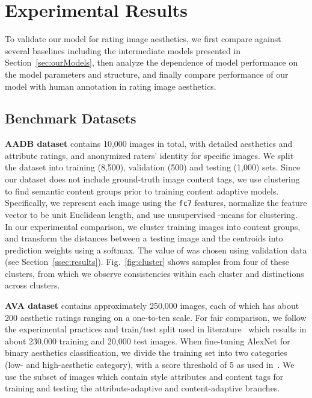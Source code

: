 \documentclass[runningheads]{llncs}
\begin{document}
\section{Experimental Results}
\label{sec:exp}

To validate our model for rating image aesthetics, we
first compare against several baselines including the intermediate models
presented in Section~\ref{sec:ourModels},
then analyze the dependence of model
performance on the model parameters and structure, and finally compare
performance of our model with human annotation in rating image
aesthetics.


\subsection{Benchmark Datasets}

\noindent \textbf{AADB dataset } contains 10,000 images in total, with
detailed aesthetics and attribute ratings, and anonymized raters' identity for specific
images.  We split the dataset into training (8,500), validation (500) and
testing (1,000) sets. Since our dataset does not include ground-truth image content tags, we use clustering to find semantic content groups prior to training
content adaptive models.
Specifically, we represent each image using the
\texttt{fc7} features, normalize the feature vector to
be unit Euclidean length, and use unsupervised -means for clustering.  In our
experimental comparison, we cluster training images into  content groups,
and transform the distances between a testing image and the centroids into
prediction weights using a softmax.
The value of  was chosen using
validation data (see Section~\ref{ssec:results}).
Fig.~\ref{fig:cluster} shows
samples from four of these clusters,
from which we observe consistencies within each cluster and distinctions across clusters.

\noindent \textbf{AVA dataset } contains approximately 250,000 images,
each of which has about 200 aesthetic ratings ranging on a one-to-ten scale.
For fair comparison,
we follow the experimental practices and train/test split used in
literature~\cite{lu2014rapid,xin2015iccv,murray2012ava} which
results in about 230,000 training and 20,000 test images.  When fine-tuning
AlexNet for binary aesthetics classification, we divide the training set into
two categories (low- and high-aesthetic category), with a score threshold of 5
as used in~\cite{lu2014rapid,xin2015iccv,murray2012ava}.
We use the subset of images which contain style attributes and content tags for training and testing the attribute-adaptive and
content-adaptive branches.
\end{document}
